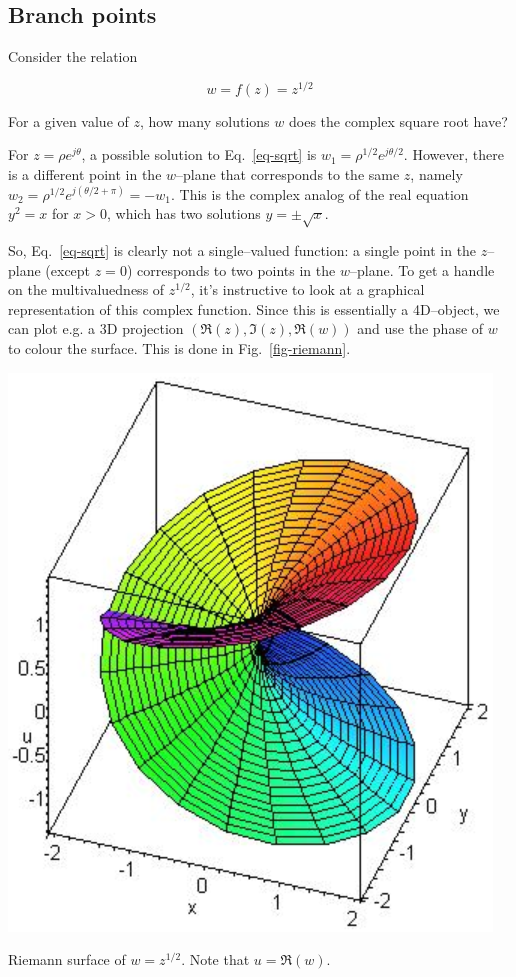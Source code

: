 \subsection*{Branch points}

Consider the relation

\begin{equation}
w = f(z) = z^{1/2} \label{eq-sqrt}
\end{equation}

\begin{cue}
For a given value of $z$, how many solutions $w$ does the complex square root have? 
\end{cue}

For $z=\rho e^{j\theta}$, a possible solution to Eq.~\ref{eq-sqrt} is $w_1 = \rho^{1/2} e^{j\theta/2}$. However, there is a different point in the $w$--plane that corresponds to the same $z$, namely $w_2 = \rho^{1/2} e^{j(\theta/2+\pi)} = -w_1$. This is the complex analog of the real equation $y^2 = x$ for $x > 0$, which has two solutions $y = \pm \sqrt{x}$.

So, Eq.~\ref{eq-sqrt} is clearly not a single--valued function: a single point in the $z$--plane (except $z=0$) corresponds to two points in the $w$--plane. To get a handle on the multivaluedness of $z^{1/2}$, it's instructive to look at a graphical representation of this complex function. Since this is essentially a 4D--object, we can plot e.g. a 3D projection $(\Re(z),\Im(z),\Re(w))$ and use the phase of $w$ to colour the surface. This is done in Fig.~\ref{fig-riemann}.

\begin{marginfigure}
\centering
\includegraphics{complex/figures/riemann}
\caption{Riemann surface of $w=z^{1/2}$. Note that $u=\Re(w)$. }
\label{fig-riemann}
\end{marginfigure}

